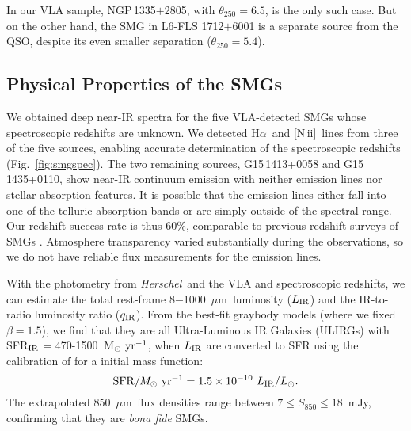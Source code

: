 \documentclass[iop,revtex4,twocolumn,apj,numberedappendix,appendixfloats]{emulateapj}
\newcommand{\hers}{{\it Herschel}}
\newcommand{\msunyr}{${\rm M}_{\odot}~{\rm yr}^{-1}$}
\newcommand{\um}{$\mu$m}
\newcommand{\Ha}{H$\alpha$}
\newcommand{\NII}{[N\,{\sc ii}]}
\begin{document}
In our VLA sample, NGP\,1335$+$2805,
with $\theta_{250} = 6.5$\arcsec, is the only such case.
But on the other hand, the SMG in L6-FLS 1712$+$6001 is a separate source from the QSO, despite its even smaller separation ($\theta_{250} = 5.4$\arcsec). 


\subsection{Physical Properties of the SMGs}

We obtained deep near-IR spectra for the five VLA-detected SMGs whose spectroscopic redshifts are unknown. We detected \Ha\ and \NII\ lines from three of the five sources, enabling accurate determination of the spectroscopic redshifts (Fig.~\ref{fig:smgspec}). The two remaining sources, G15\,1413+0058 and G15\,1435+0110, show near-IR continuum emission with neither emission lines nor stellar absorption features. It is possible that the emission lines either fall into one of the telluric absorption bands or are simply outside of the spectral range.
Our redshift success rate is thus 60\%, comparable to previous redshift surveys of SMGs \citep[e.g.,][]{Chapman05}. Atmosphere transparency varied substantially during the observations, so we do not have reliable flux measurements for the emission lines.


With the photometry from \hers\ and the VLA and spectroscopic redshifts, we can estimate the total rest-frame 8$-$1000~\um\ luminosity ($L_{\rm IR}$) and the IR-to-radio luminosity ratio ($q_{\rm IR}$). From the best-fit graybody models (where we fixed $\beta = 1.5$), we find that they are all Ultra-Luminous IR Galaxies (ULIRGs) with SFR$_{\rm IR}$ = 470-1500~\msunyr, when $L_{\rm IR}$ are converted to SFR using the calibration of \citet{Murphy11} for a \citet{Kroupa02} initial mass function:
\begin{equation}
 {\rm SFR}/M_{\odot}~{\rm yr}^{-1} = 1.5\times10^{-10}~L_{\rm IR}/L_{\odot}. 
\end{equation} 
The extrapolated 850~\um\ flux densities range between $7 \leq S_{850} \leq 18$~mJy, confirming that they are {\it bona fide} SMGs. 
\end{document}
